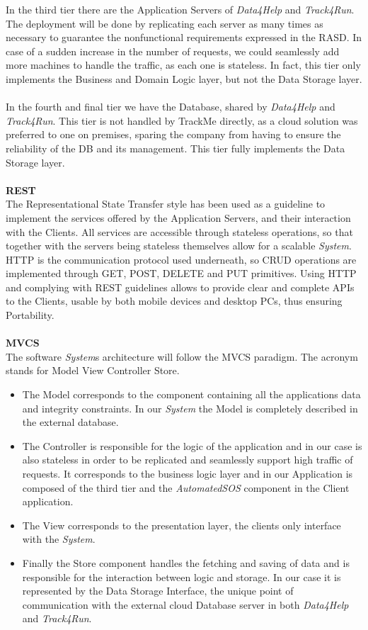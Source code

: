\documentclass[titlepage]{article}
\begin{document}
	In the third tier there are the Application Servers of {\it Data4Help} and {\it Track4Run}. The deployment will be done by replicating each server as many times as necessary to guarantee the nonfunctional requirements expressed in the RASD. In case of a sudden increase in the number of requests, we could seamlessly add more machines to handle the traffic, as each one is stateless. In fact, this tier only implements the Business and Domain Logic layer, but not the Data Storage layer. \\ \\
	In the fourth and final tier we have the Database, shared by {\it Data4Help} and {\it Track4Run}. This tier is not handled by TrackMe directly, as a cloud solution was preferred to one on premises, sparing the company from having to ensure the reliability of the DB and its management. 
	This tier fully implements the Data Storage layer.\\ \\
	{\bf REST}\\
	The Representational State Transfer style has been used as a guideline to implement the services offered by the Application Servers, and their interaction with the Clients. All services are accessible through stateless operations, so that together with the servers being stateless themselves allow for a scalable {\it System}.
	HTTP is the communication protocol used underneath, so CRUD operations are implemented through GET, POST, DELETE and PUT primitives. 
	Using HTTP and complying with REST guidelines allows to provide clear and complete APIs to the Clients, usable by both mobile devices and desktop PCs, thus ensuring Portability.\\ \\
	{\bf MVCS}\\
	The software {\it System}\textsc{}s architecture will follow the MVCS paradigm. The acronym stands for Model View Controller Store.
	\begin{itemize}
		\item {} The Model corresponds to the component containing all the application\textsc{}s data and integrity constraints. In our {\it System} the Model is completely described in the external database.
		\item {} The Controller is responsible for the logic of the application and in our case is also stateless in order to be replicated and seamlessly support high traffic of requests. It corresponds to the business logic layer and in our Application is composed of the third tier and the {\it AutomatedSOS} component in the Client application. 
		\item {} The View corresponds to the presentation layer, the client\textsc{}s only interface with the {\it System}. 
		\item {} Finally the Store component handles the fetching and saving of data and is responsible for the interaction between logic and storage. In our case it is represented by the Data Storage Interface, the unique point of communication with the external cloud Database server in both {\it Data4Help} and {\it Track4Run}.
	\end{itemize} 
\end{document}
